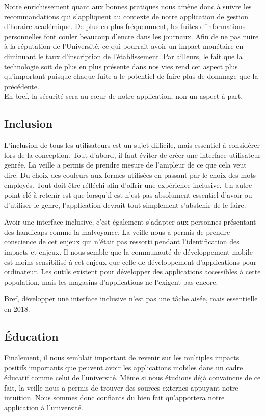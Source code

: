 		Notre enrichissement quant aux bonnes pratiques nous amène donc à suivre les recommandations qui s'appliquent au contexte de notre application de gestion d'horaire académique. De plus en plus fréquemment, les fuites d'informations personnelles font couler beaucoup d'encre dans les journaux. Afin de ne pas nuire à la réputation de l'Université, ce qui pourrait avoir un impact monétaire en diminuant le taux d'inscription de l'établissement. Par ailleurs, le fait que la technologie soit de plus en plus présente dans nos vies rend cet aspect plus qu'important puisque chaque fuite a le potentiel de faire plus de dommage que la précédente. \\
		
		En bref, la sécurité sera au c\oe ur de notre application, non un aspect à part. 
		
		\subsection{Inclusion}
		L'inclusion de tous les utilisateurs est un sujet difficile, mais essentiel à considérer lors de la conception. Tout d'abord, il faut éviter de créer une interface utilisateur genrée. La veille a permis de prendre mesure de l'ampleur de ce que cela veut dire. Du choix des couleurs aux formes utilisées en passant par le choix des mots employés. Tout doit être réfléchi afin d'offrir une expérience inclusive. Un autre point clé à retenir est que lorsqu'il est n'est pas absolument essentiel d'avoir ou d'utiliser le genre, l'application devrait tout simplement s'abstenir de le faire.
		
		Avoir une interface inclusive, c'est également s'adapter aux personnes présentant des handicaps comme la malvoyance. La veille nous a permis de prendre conscience de cet enjeux qui n'était pas ressorti pendant l'identification des impacts et enjeux. Il nous semble que la communauté de développement mobile est moins sensibilisé à cet enjeux que celle de développement d'applications pour ordinateur. Les outils existent pour développer des applications accessibles à cette population, mais les magasins d'applications ne l'exigent pas encore.
		
		Bref, développer une interface inclusive n'est pas une tâche aisée, mais essentielle en 2018.
		
		\subsection{Éducation}
		Finalement, il nous semblait important de revenir sur les multiples impacts positifs importants que peuvent avoir les applications mobiles dans un cadre éducatif comme celui de l'université. Même si nous étudions déjà convaincus de ce fait, la veille nous a permis de trouver des sources externes appuyant notre intuition. Nous  sommes donc confiants du bien fait qu'apportera notre application à l'université.
		
		
	
	
	
	
	
	